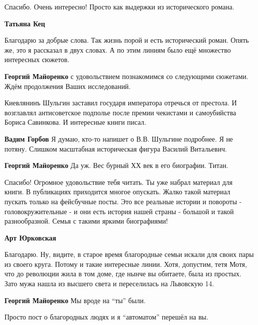 \begin{itemize}
Спасибо. Очень интересно! Просто как выдержки из исторического романа.

\begin{itemize} %
\textbf{Татьяна Кец} 

Благодарю за добрые слова. Так жизнь порой и есть исторический роман. Опять же,
это я рассказал в двух словах. А по этим линиям было ещё множество интересных
сюжетов.


\textbf{Георгий Майоренко} с удовольствием познакомимся со следующими сюжетами. Ждём продолжения Ваших исследований.
\end{itemize} %


Киевлянинъ Шульгин заставил государя императора отречься от престола. И
возглавлял антисоветское подполье после премии чекистами и самоубийства Бориса
Савинкова. И интересные книги писал.

\begin{itemize} %
\textbf{Вадим Горбов} Я думаю, кто-то напишет о В.В. Шульгине подробнее. Я не потяну. Слишком масштабная историческая фигура Василий Витальевич.

\textbf{Георгий Майоренко} Да уж. Вес бурный ХХ век в его биографии. Титан.
\end{itemize} %


Спасибо! Огромное удовольствие тебя читать. Ты уже набрал материал для книги. В
публикациях приходится многое опускать. Жалко такой материал пускать только на
фейсбучные посты. Это все реальные истории и повороты - головокружительные - и
они есть история нашей страны - большой и такой разнообразной. Семья с такими
яркими биографиями!

\begin{itemize} %
\textbf{Арт Юрковская} 

Благодарю. Ну, видите, в старое время благородные семьи искали для своих пары
из своего круга. Потому и такие интересные линии. Хотя, допустим, тетя Мотя,
что до революции жила в том доме, где нынче вы обитаете, была из простых. Зато
мужа нашла из высшего света и переселилась на Львовскую 14.

\begin{itemize} %
\textbf{Георгий Майоренко} Мы вроде на \enquote{ты} были.

Просто пост о благородных людях и я \enquote{автоматом} перешёл на вы.
\end{itemize} %


\end{itemize}
\end{itemize}
